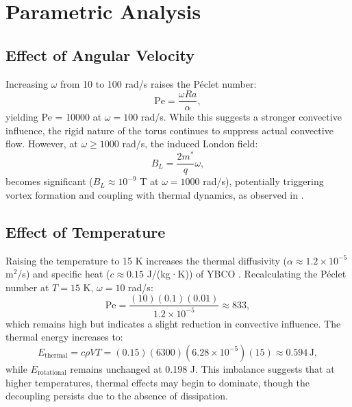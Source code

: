 \documentclass[12pt]{article}
\begin{document}
\section{Parametric Analysis}
\subsection{Effect of Angular Velocity}
Increasing $\omega$ from 10 to 100 rad/s raises the Péclet number:
\begin{equation}
    \text{Pe} = \frac{\omega R a}{\alpha},
\end{equation}
yielding Pe = 10000 at $\omega = 100$ rad/s. While this suggests a stronger convective influence, the rigid nature of the torus continues to suppress actual convective flow. However, at $\omega \geq 1000$ rad/s, the induced London field:
\begin{equation}
    B_L = \frac{2 m^*}{q} \omega,
\end{equation}
becomes significant ($B_L \approx 10^{-9}$ T at $\omega = 1000$ rad/s), potentially triggering vortex formation and coupling with thermal dynamics, as observed in \citet{Bulaevskii2022}.

\subsection{Effect of Temperature}
Raising the temperature to 15 K increases the thermal diffusivity ($\alpha \approx 1.2 \times 10^{-5}$ m$^2$/s) and specific heat ($c \approx 0.15$ J/(kg·K)) of YBCO \citep{Kittel2005}. Recalculating the Péclet number at $T = 15$ K, $\omega = 10$ rad/s:
\begin{equation}
    \text{Pe} = \frac{(10)(0.1)(0.01)}{1.2 \times 10^{-5}} \approx 833,
\end{equation}
which remains high but indicates a slight reduction in convective influence. The thermal energy increases to:
\begin{equation}
    E_{\text{thermal}} = c \rho V T = (0.15) (6300) (6.28 \times 10^{-5}) (15) \approx 0.594 \, \text{J},
\end{equation}
while $E_{\text{rotational}}$ remains unchanged at 0.198 J. This imbalance suggests that at higher temperatures, thermal effects may begin to dominate, though the decoupling persists due to the absence of dissipation.
\end{document}
